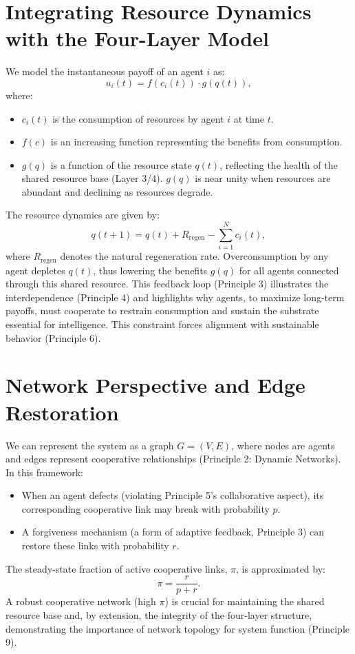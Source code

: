 \section{Integrating Resource Dynamics with the Four-Layer Model}
We model the instantaneous payoff of an agent \( i \) as:
\[
u_i(t) = f(c_i(t)) \cdot g(q(t)),
\]
where:
\begin{itemize}
    \item \( c_i(t) \) is the consumption of resources by agent \( i \) at time \( t \).
    \item \( f(c) \) is an increasing function representing the benefits from consumption.
    \item \( g(q) \) is a function of the resource state \( q(t) \), reflecting the health of the shared resource base (Layer 3/4). \( g(q) \) is near unity when resources are abundant and declining as resources degrade.
\end{itemize}
The resource dynamics are given by:
\[
q(t+1) = q(t) + R_{\text{regen}} - \sum_{i=1}^{N} c_i(t),
\]
where \( R_{\text{regen}} \) denotes the natural regeneration rate. Overconsumption by any agent depletes \( q(t) \), thus lowering the benefits \( g(q) \) for all agents connected through this shared resource. This feedback loop (Principle 3) illustrates the interdependence (Principle 4) and highlights why agents, to maximize long-term payoffs, must cooperate to restrain consumption and sustain the substrate essential for intelligence. This constraint forces alignment with sustainable behavior (Principle 6). %

\section{Network Perspective and Edge Restoration}
We can represent the system as a graph \( G = (V,E) \), where nodes are agents and edges represent cooperative relationships (Principle 2: Dynamic Networks). In this framework:
\begin{itemize}
    \item When an agent defects (violating Principle 5's collaborative aspect), its corresponding cooperative link may break with probability \( p \).
    \item A forgiveness mechanism (a form of adaptive feedback, Principle 3) can restore these links with probability \( r \).
\end{itemize}
The steady-state fraction of active cooperative links, \( \pi \), is approximated by:
\[
\pi = \frac{r}{p + r}.
\]
A robust cooperative network (high \( \pi \)) is crucial for maintaining the shared resource base and, by extension, the integrity of the four-layer structure, demonstrating the importance of network topology for system function (Principle 9). %

